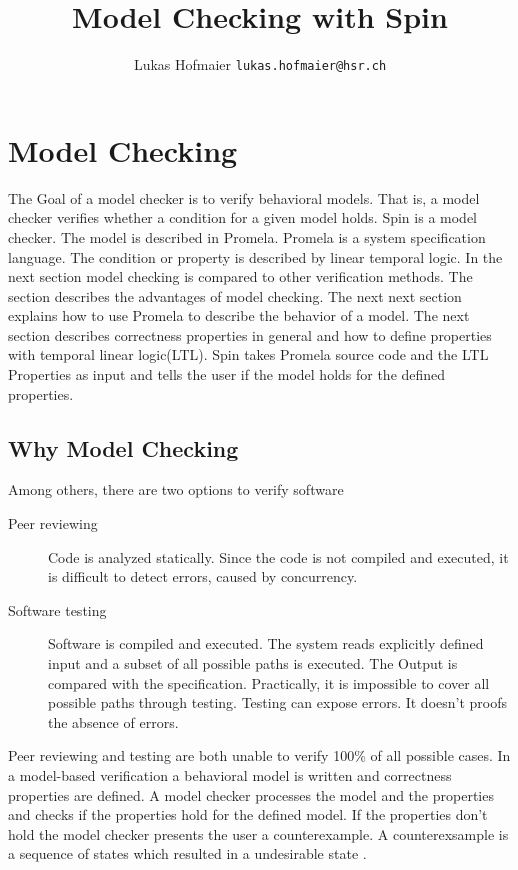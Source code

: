 \documentclass[a4paper, twoside]{article}
\begin{document}
\title{Model Checking with Spin}
\author{Lukas Hofmaier \texttt{lukas.hofmaier@hsr.ch}}

\maketitle
\tableofcontents

\section{Model Checking}
\label{sec:modelchecking}

The Goal of a model checker is to verify behavioral models. That is, a model checker verifies whether a condition for a given model holds. Spin is a model checker. The model is described in Promela. Promela is a system specification language. The condition or property is described by linear temporal logic. In the next section model checking is compared to other verification methods. The section describes the advantages of model checking. The next next section explains how to use Promela to describe the behavior of a model. The next section describes correctness properties in general and how to define properties with temporal linear logic(LTL). Spin takes Promela source code and the LTL Properties as input and tells the user if the model holds for the defined properties.

\subsection{Why Model Checking}
\label{sec:why}

Among others, there are two options to verify software
\begin{description}
\item[Peer reviewing] Code is analyzed statically. Since the code is not compiled and executed, it is difficult to detect errors, caused by concurrency.
\item[Software testing] Software is compiled and executed. The system reads explicitly defined input and a subset of all possible paths is executed. The Output is compared with the specification. Practically, it is impossible to cover all possible paths through testing. Testing can expose errors. It doesn't proofs the absence of errors.
\end{description}

Peer reviewing and testing are both unable to verify 100\% of all possible cases. In a model-based verification a behavioral model is written and correctness properties are defined. A model checker processes the model and the properties and checks if the properties hold for the defined model. If the properties don't hold the model checker presents the user a counterexample. A counterexsample is a sequence of states which resulted in a undesirable state \cite{baier08}.
\end{document}
